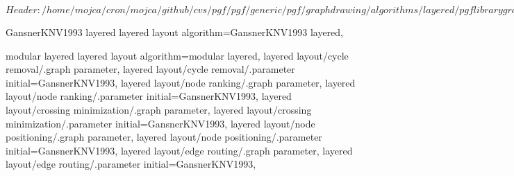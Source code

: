 %
%
%

\ProvidesFileRCS[v\pgfversion] $Header: /home/mojca/cron/mojca/github/cvs/pgf/pgf/generic/pgf/graphdrawing/algorithms/layered/pgflibrarygraphdrawing.layered.code.tex,v 1.7 2011/12/02 14:50:18 tantau Exp $





%
% 




%
%



%
%
%
\pgfgddeclarealgorithmkey
  {GansnerKNV1993 layered}
  {layered layout}
  {
    algorithm=GansnerKNV1993 layered,
  }


%
%
\pgfgddeclarealgorithmkey
  {modular layered}
  {layered layout}
  {
    algorithm=modular layered,
    layered layout/cycle removal/.graph parameter,
    layered layout/cycle removal/.parameter initial=GansnerKNV1993,
    layered layout/node ranking/.graph parameter,
    layered layout/node ranking/.parameter initial=GansnerKNV1993,
    layered layout/crossing minimization/.graph parameter,
    layered layout/crossing minimization/.parameter initial=GansnerKNV1993,
    layered layout/node positioning/.graph parameter,
    layered layout/node positioning/.parameter initial=GansnerKNV1993,
    layered layout/edge routing/.graph parameter,
    layered layout/edge routing/.parameter initial=GansnerKNV1993,
  }

\endinput
